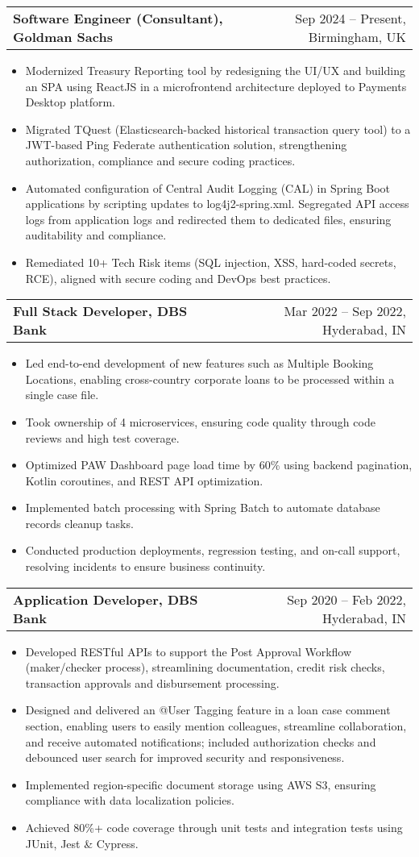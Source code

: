 \documentclass[a4paper,12pt]{article}
\makeatletter
\newenvironment{joblong}[2]
    {
    \begin{tabularx}{\linewidth}{@{}l X r@{}}
    \textbf{#1} & &  #2 \\
    \end{tabularx}
    \begin{minipage}[t]{\linewidth}
    \begin{itemize}[nosep,after=\strut, leftmargin=1em, itemsep=3pt,label=--]
    }
    {
    \end{itemize}
    \end{minipage}    
    }
\makeatother
\begin{document}
\begin{joblong}{Software Engineer (Consultant), Goldman Sachs}{Sep 2024 -- Present, Birmingham, UK}
\item Modernized Treasury Reporting tool by redesigning the UI/UX and building an SPA using ReactJS in a microfrontend architecture deployed to Payments Desktop platform.
\item Migrated TQuest (Elasticsearch-backed historical transaction query tool) to a JWT-based Ping Federate authentication solution, strengthening authorization, compliance and secure coding practices.
\item Automated configuration of Central Audit Logging (CAL) in Spring Boot applications by scripting updates to log4j2-spring.xml. Segregated API access logs from application logs and redirected them to dedicated files, ensuring auditability and compliance.
\item Remediated 10+ Tech Risk items (SQL injection, XSS, hard-coded secrets, RCE), aligned with secure coding and DevOps best practices.
\end{joblong}
\begin{joblong}{Full Stack Developer, DBS Bank}{Mar 2022 -- Sep 2022, Hyderabad, IN}
\item Led end-to-end development of new features such as Multiple Booking Locations, enabling cross-country corporate loans to be processed within a single case file.
\item Took ownership of 4 microservices, ensuring code quality through code reviews and high test coverage.
\item Optimized PAW Dashboard page load time by 60\% using backend pagination, Kotlin coroutines, and REST API optimization.
\item Implemented batch processing with Spring Batch to automate database records cleanup tasks.
\item Conducted production deployments, regression testing, and on-call support, resolving incidents to ensure business continuity.
\end{joblong}
\begin{joblong}{Application Developer, DBS Bank}{Sep 2020 -- Feb 2022, Hyderabad, IN}
\item Developed RESTful APIs to support the Post Approval Workflow (maker/checker process), streamlining documentation, credit risk checks, transaction approvals and disbursement processing.
\item Designed and delivered an @User Tagging feature in a loan case comment section, enabling users to easily mention colleagues, streamline collaboration, and receive automated notifications; included authorization checks and debounced user search for improved security and responsiveness.
\item Implemented region-specific document storage using AWS S3, ensuring compliance with data localization policies.
\item Achieved 80\%+ code coverage through unit tests and integration tests using JUnit, Jest \& Cypress.
\end{joblong}
\end{document}
